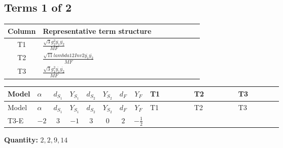 \documentclass[8pt]{article}
\begin{document}
\begin{landscape}
\subsection*{Terms 1 of 2}
\begin{center}
\begin{tabular}{@{}c >{\raggedright\arraybackslash}p{0.82\linewidth}@{}}
\toprule
Column & Representative term structure \\
\midrule
T1 & \(\displaystyle \frac{\sqrt{3} g_{2}^{2} \overline{y_{1}} \overline{y_{2}}}{MF}\) \\
\midrule
T2 & \(\displaystyle \frac{\sqrt{11} lambda12Inv2 \overline{y_{1}} \overline{y_{2}}}{MF}\) \\
\midrule
T3 & \(\displaystyle \frac{\sqrt{3} g_{1}^{2} \overline{y_{1}} \overline{y_{2}}}{MF}\) \\
\midrule
\bottomrule
\end{tabular}
\end{center}
\smallskip
\tiny
\begin{longtable}{@{}llcccccc >{\raggedright\arraybackslash}p{0.21\linewidth} >{\raggedright\arraybackslash}p{0.21\linewidth} >{\raggedright\arraybackslash}p{0.21\linewidth}@{}}
\toprule
Model & $\alpha$ & $d_{S_1}$ & $Y_{S_1}$ & $d_{S_2}$ & $Y_{S_2}$ & $d_F$ & $Y_F$ & T1 & T2 & T3 \\
\midrule
\endfirsthead
\toprule
Model & $\alpha$ & $d_{S_1}$ & $Y_{S_1}$ & $d_{S_2}$ & $Y_{S_2}$ & $d_F$ & $Y_F$ & T1 & T2 & T3 \\
\midrule
\endhead
T3-E & $-2$ & $3$ & $-1$ & $3$ & $0$ & $2$ & $-\frac{1}{2}$ & \scriptsize\adjustbox{max width=\linewidth}{$\begin{gathered} - \frac{11 \sqrt{3} g_{2}^{2} \overline{y_{1}} \overline{y_{2}}}{8 MF}\end{gathered}$} & \scriptsize\adjustbox{max width=\linewidth}{$\begin{gathered} - \frac{3 \sqrt{11} lambda12Inv2 \overline{y_{1}} \overline{y_{2}}}{22 MF}\end{gathered}$} & \scriptsize\adjustbox{max width=\linewidth}{$\begin{gathered} - \frac{\sqrt{3} g_{1}^{2} \overline{y_{1}} \overline{y_{2}}}{8 MF}\end{gathered}$} \\
\midrule
\bottomrule
\end{longtable}
\clearpage
\noindent\textbf{Quantity: }$\mathrm{2,2,9,14}$\par\smallskip

\end{landscape}
\end{document}
